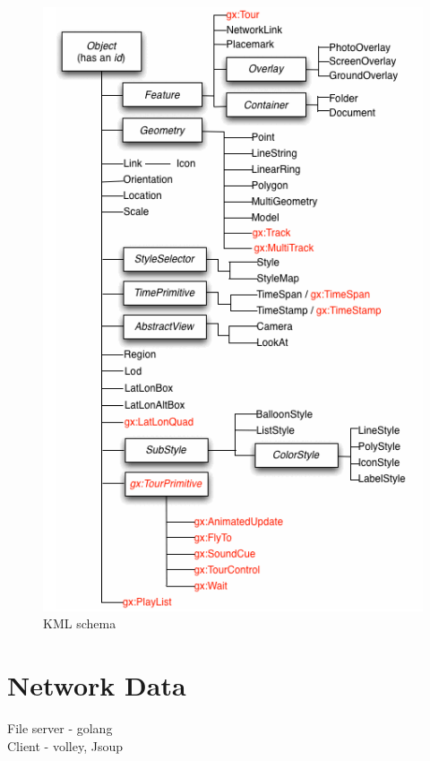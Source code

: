 \begin{figure}[H]
\caption[kml-schema]{KML schema \parencite{Google.kml.2016}}
\label{fig:kml-schema}
\centering
\includegraphics[height=0.5\textheight]{Figures/kml-schema.png}
\decoRule
\end{figure}

\section{Network Data}

File server - golang\\
Client - volley, Jsoup\\


